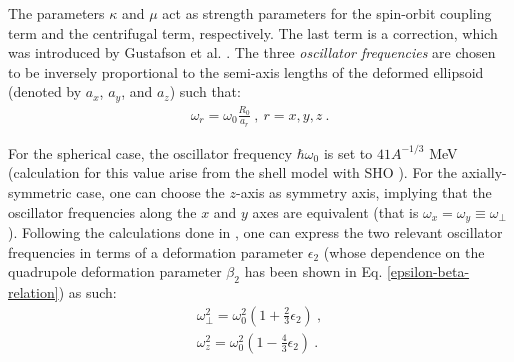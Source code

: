 The parameters $\kappa$ and $\mu$ act as strength parameters for the spin-orbit coupling term and the centrifugal term, respectively. The last term is a correction, which was introduced by Gustafson et al. \cite{gustafson1967nuclear}.
The three \emph{oscillator frequencies} are chosen to be inversely proportional to the semi-axis lengths of the deformed ellipsoid (denoted by $a_x$, $a_y$, and $a_z$) such that:
\begin{align}
    \omega_r=\omega_0\frac{R_0}{a_r}\ ,\ r=x,y,z\ .
\end{align}

For the spherical case, the oscillator frequency $\hbar\omega_0$ is set to $41A^{-1/3}$ MeV (calculation for this value arise from the shell model with SHO \cite{bertulani2007nuclear}). For the axially-symmetric case, one can choose the $z$-axis as symmetry axis, implying that the oscillator frequencies along the $x$ and $y$ axes are equivalent (that is $\omega_x=\omega_y\equiv\omega_\perp$). Following the calculations done in \cite{bertulani2007nuclear}, one can express the two relevant oscillator frequencies in terms of a deformation parameter $\epsilon_2$ (whose dependence on the quadrupole deformation parameter $\beta_2$ has been shown in Eq. \ref{epsilon-beta-relation}) as such:
\begin{align}
    \omega_\perp^2=\omega_0^2\left(1+\frac{2}{3}\epsilon_2\right)\ ,\\
    \omega_z^2=\omega_0^2\left(1-\frac{4}{3}\epsilon_2\right)\ .
    \label{oscillator-frequencies-nilsson}
\end{align}

